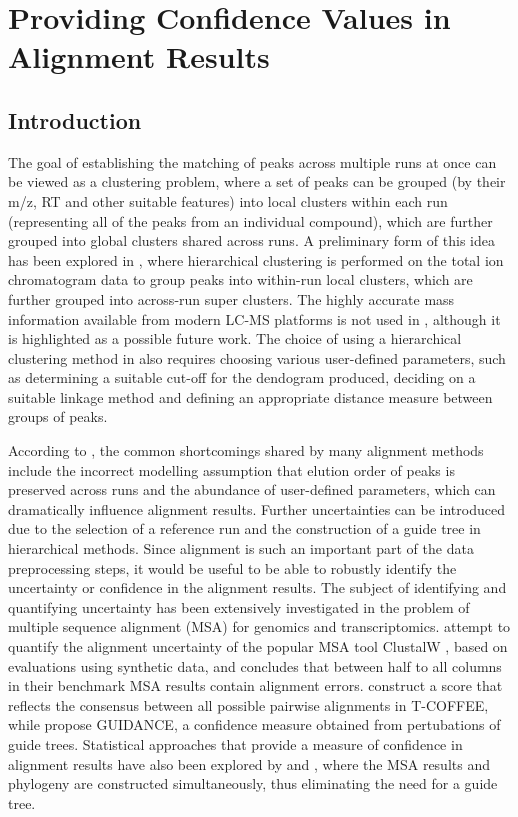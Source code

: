 \chapter{Providing Confidence Values in Alignment Results}
\label{c:hdp}


\section{Introduction}

The goal of establishing the matching of peaks across multiple runs at once can be viewed as a clustering problem, where a set of peaks can be grouped (by their m/z, RT and other suitable features) into local clusters within each run (representing all of the peaks from an individual compound), which are further grouped into global clusters shared across runs. A preliminary form of this idea has been explored in \cite{DeSouza2006}, where hierarchical clustering is performed on the total ion chromatogram data to group peaks into within-run local clusters, which are further grouped into across-run super clusters. The highly accurate mass information available from modern LC-MS platforms is not used in \cite{DeSouza2006}, although it is highlighted as a possible future work. The choice of using a hierarchical clustering method in \cite{DeSouza2006} also requires choosing various user-defined parameters, such as determining a suitable cut-off for the dendogram produced, deciding on a suitable linkage method and defining an appropriate distance measure between groups of peaks.

According to \cite{Smith2013}, the common shortcomings shared by many alignment methods include the incorrect modelling assumption that elution order of peaks is preserved across runs and the abundance of user-defined parameters, which can dramatically influence alignment results. Further uncertainties can be introduced due to the selection of a reference run and the construction of a guide tree in hierarchical methods. Since alignment is such an important part of the data preprocessing steps, it would be useful to be able to robustly identify the uncertainty or confidence in the alignment results. The subject of identifying and quantifying uncertainty has been extensively investigated in the problem of multiple sequence alignment (MSA) for genomics and transcriptomics. \cite{Landan2009} attempt to quantify the alignment uncertainty of the popular MSA tool ClustalW \cite{Thompson1994}, based on evaluations using synthetic data, and concludes that between half to all columns in their benchmark MSA results contain alignment errors. \cite{Notredame2000} construct a score that reflects the consensus between all possible pairwise alignments in T-COFFEE, while \cite{Penn2010} propose GUIDANCE, a confidence measure obtained from pertubations of guide trees. Statistical approaches that provide a measure of confidence in alignment results have also been explored by \cite{Redelings2005} and \cite{Bradley2009}, where the MSA results and phylogeny are constructed simultaneously, thus eliminating the need for a guide tree. 

